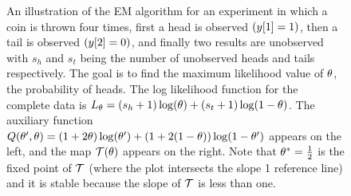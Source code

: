 \begin{figure}[htbp]
  \caption[An illustration of the EM algorithm.]%
  {An illustration of the EM algorithm for an experiment in which a
    coin is thrown four times, first a head is observed
    $({y}{[1]}=1)$, then a tail is observed $({y}{[2]}=0)$, and
    finally two results are unobserved with $s_h$ and $s_t$ being the
    number of unobserved heads and tails respectively.  The goal is to
    find the maximum likelihood value of $\theta$, the
    probability of heads.  The log likelihood function for the
    complete data is $L_{\theta} = (s_h + 1)\log(\theta) +
    (s_t +1)\log(1-\theta)$.  The auxiliary function
    $Q(\theta',\theta) = (1+2\theta)\log(\theta')
    + (1 + 2(1-\theta))\log(1-\theta')$ appears on the left,
    and the map $\EMmap(\parameters)$ appears on the right.  Note that
    $\theta^* = \frac{1}{2}$ is the fixed point of $\EMmap$
    (where the plot intersects the slope 1 reference line) and it is stable
    because the slope of $\EMmap$ is less than one.}
  \label{fig:EM}
\end{figure}

